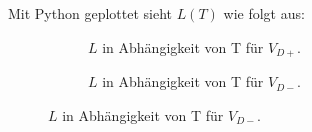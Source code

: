 Mit Python geplottet sieht $L(T)$ wie folgt aus:
\begin{figure}
  \begin{subfigure}{0.3\textwidth}
  \centering
  \caption{$L$ in Abhängigkeit von T für $V_{D+}$.}
  \label{fig:Verdampfungswärme1}
  \end{subfigure}
  \hfill
  \begin{subfigure}{0.3\textwidth}
  \centering
  \caption{$L$ in Abhängigkeit von T für $V_{D-}$.}
  \label{fig:Verdampfungswärme2}
  \end{subfigure}
\end{figure}
